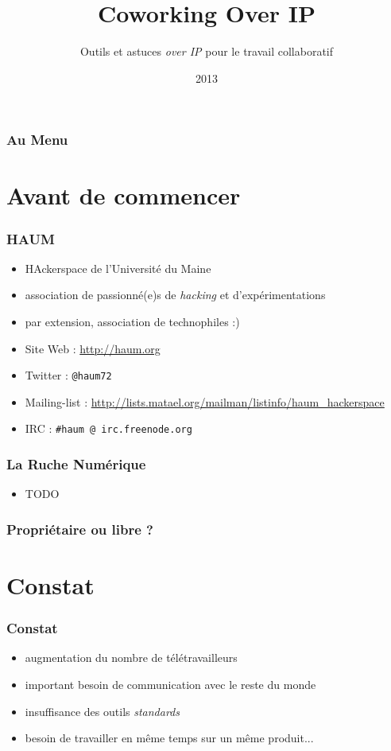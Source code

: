 \documentclass{beamer}
\title[Coworking-oIP]{Coworking Over IP}
\author{Outils et astuces \textit{over IP} pour le travail collaboratif}
\institute{Mathieu (matael) Gaborit | HAUM | Ruche Numérique}
\date{2013}
\begin{document}
\begin{frame}
\titlepage
\end{frame}

\begin{frame}
\frametitle{Au Menu}
\tableofcontents
\end{frame}

\section{Avant de commencer} %

\begin{frame}
    \frametitle{HAUM}

    \begin{itemize}
        \item HAckerspace de l'Université du Maine
        \item association de passionné(e)s de \textit{hacking} et d'expérimentations
        \item par extension, association de technophiles :)
        \item Site Web : \url{http://haum.org}
        \item Twitter : \texttt{@haum72}
        \item Mailing-list : \url{http://lists.matael.org/mailman/listinfo/haum_hackerspace}
        \item IRC : \texttt{\#haum @ irc.freenode.org}
    \end{itemize}
\end{frame}

\begin{frame}
    \frametitle{La Ruche Numérique}

    \begin{itemize}
        \item TODO
    \end{itemize}
\end{frame}

\begin{frame}
    \frametitle{Propriétaire ou libre ?} 
\end{frame}

\section{Constat}

\begin{frame}
    \frametitle{Constat}

    \begin{itemize}[<+->]
        \item augmentation du nombre de télétravailleurs
        \item important besoin de communication avec le reste du monde
        \item insuffisance des outils \textit{standards}
        \item besoin de travailler en même temps sur un même produit...
    \end{itemize}
\end{frame}
\end{document}
